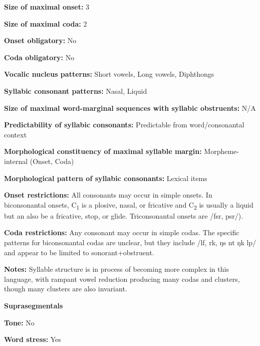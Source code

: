 \textbf{Size of maximal onset:} 3



\textbf{Size of maximal coda:} 2



\textbf{Onset obligatory:} No



\textbf{Coda obligatory:} No



\textbf{Vocalic nucleus patterns:} Short vowels, Long vowels, Diphthongs



\textbf{Syllabic consonant patterns:} Nasal, Liquid



\textbf{Size of maximal word{}-marginal sequences with syllabic obstruents:} N/A



\textbf{Predictability of syllabic consonants:} Predictable from word/consonantal context



\textbf{Morphological constituency of maximal syllable margin:} Morpheme-internal (Onset, Coda)



\textbf{Morphological pattern of syllabic consonants:} Lexical items



\textbf{Onset restrictions:} All consonants may occur in simple onsets. In biconsonantal onsets, C\textsubscript{1} is a plosive, nasal, or fricative and C\textsubscript{2} is usually a liquid but an also be a fricative, stop, or glide. Triconsonantal onsets are /fsr, psr/).



\textbf{Coda restrictions:} Any consonant may occur in simple codas. The specific patterns for biconsonantal codas are unclear, but they include /lf, rk, ŋs nt ŋk lp/ and appear to be limited to sonorant+obstruent.



\textbf{Notes:} Syllable structure is in process of becoming more complex in this language, with rampant vowel reduction producing many codas and clusters, though many clusters are also invariant.



\textbf{Suprasegmentals}



\textbf{Tone:} No



\textbf{Word stress:} Yes



